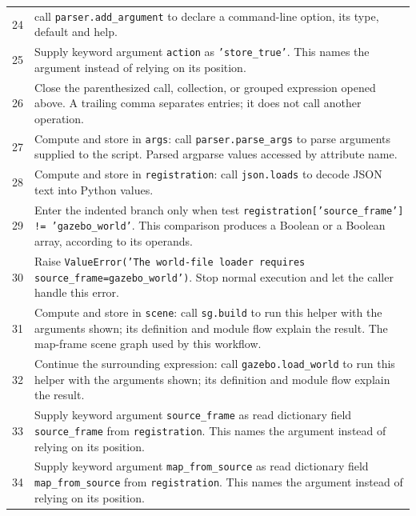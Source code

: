 \documentclass[11pt,a4paper]{book}
\begin{document}
\begin{longtable}{r p{}}
24 & call \texttt{parser.add\_argument} to declare a command-line option, its type, default and help. \\

25 & Supply keyword argument \texttt{action} as \texttt{'store\_true'}. This names the argument instead of relying on its position. \\

26 & Close the parenthesized call, collection, or grouped expression opened above. A trailing comma separates entries; it does not call another operation. \\

27 & Compute and store in \texttt{args}: call \texttt{parser.parse\_args} to parse arguments supplied to the script. Parsed argparse values accessed by attribute name. \\

28 & Compute and store in \texttt{registration}: call \texttt{json.loads} to decode JSON text into Python values.  \\

29 & Enter the indented branch only when test \texttt{registration['source\_frame'] != 'gazebo\_world'}. This comparison produces a Boolean or a Boolean array, according to its operands. \\

30 & Raise \texttt{ValueError('The world-file loader requires source\_frame=gazebo\_world')}. Stop normal execution and let the caller handle this error. \\

31 & Compute and store in \texttt{scene}: call \texttt{sg.build} to run this helper with the arguments shown; its definition and module flow explain the result. The map-frame scene graph used by this workflow. \\

32 & Continue the surrounding expression: call \texttt{gazebo.load\_world} to run this helper with the arguments shown; its definition and module flow explain the result. \\

33 & Supply keyword argument \texttt{source\_frame} as read dictionary field \texttt{source\_frame} from \texttt{registration}. This names the argument instead of relying on its position. \\

34 & Supply keyword argument \texttt{map\_from\_source} as read dictionary field \texttt{map\_from\_source} from \texttt{registration}. This names the argument instead of relying on its position. \\


\end{longtable}
\end{document}
